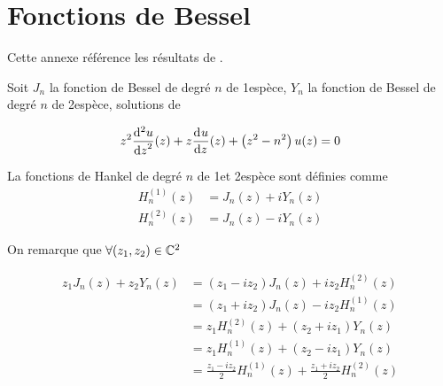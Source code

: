 \section{Fonctions de Bessel}

Cette annexe référence les résultats de \cite{abramowitz_handbook_1964}.

Soit \(J_n\) la fonction de Bessel de degré \(n\) de 1\iere espèce, \(Y_n\) la fonction de Bessel de degré \(n\) de 2\ieme espèce, solutions de

\begin{equation}
    z^2 \ddp[2]{z}{u}(z) + z\ddp{z}{u}(z)+\left(z^2-n^2\right)u(z) = 0
\end{equation}

La fonctions de Hankel de degré \(n\) de 1\iere et 2\ieme espèce sont définies comme
\begin{align}
    H_n^{(1)}(z) &= J_n(z) + iY_n(z)\\
    H_n^{(2)}(z) &= J_n(z) - iY_n(z)
\end{align}

On remarque que \(\forall (z_1,z_2) \in \CC^2\)

\begin{equation}
\begin{aligned}
z_1 J_n(z) + z_2 Y_n(z)
&= ( z_1 - i z_2 ) J_n(z) + iz_2 H_n^{(2)}(z) \\
&= ( z_1 + i z_2 ) J_n(z) - iz_2 H_n^{(1)}(z) \\
&= z_1 H_n^{(2)}(z) + ( z_2 + i z_1 ) Y_n(z) \\
&= z_1 H_n^{(1)}(z) + ( z_2 - i z_1 ) Y_n(z) \\
&= \frac{z_1-iz_2}{2}H_n^{(1)}(z) + \frac{z_1+iz_2}{2}H_n^{(2)}(z)
\end{aligned}
\label{eq:annex:bessel:equiv_bessel}
\end{equation}